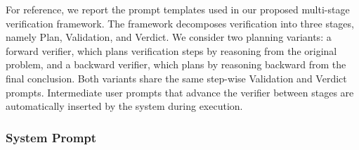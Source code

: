 \documentclass[11pt]{article}
\begin{document}
For reference, we report the prompt templates used in our proposed
multi-stage verification framework.
The framework decomposes verification into three stages, namely
Plan, Validation, and Verdict.
We consider two planning variants: a forward verifier, which plans
verification steps by reasoning from the original problem, and a
backward verifier, which plans by reasoning backward from the final
conclusion.
Both variants share the same step-wise Validation and Verdict prompts.
Intermediate user prompts that advance the verifier between stages are
automatically inserted by the system during execution.

\subsubsection{System Prompt}
\end{document}
